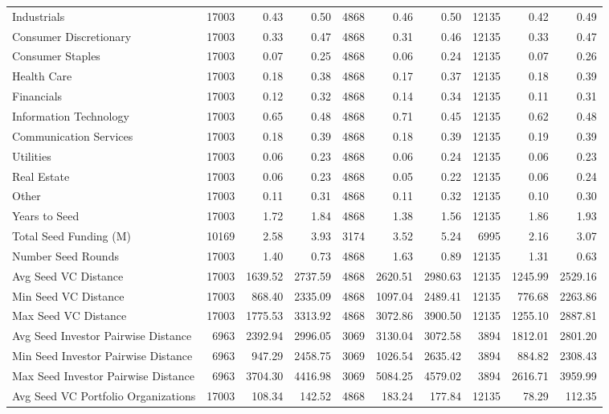 {\begin{table}[!h]
{\begin{tabular}[t]{lrrrrrrrrr}
Industrials & 17003 & 0.43 & 0.50 & 4868 & 0.46 & 0.50 & 12135 & 0.42 & 0.49\\
Consumer Discretionary & 17003 & 0.33 & 0.47 & 4868 & 0.31 & 0.46 & 12135 & 0.33 & 0.47\\
Consumer Staples & 17003 & 0.07 & 0.25 & 4868 & 0.06 & 0.24 & 12135 & 0.07 & 0.26\\
Health Care & 17003 & 0.18 & 0.38 & 4868 & 0.17 & 0.37 & 12135 & 0.18 & 0.39\\
Financials & 17003 & 0.12 & 0.32 & 4868 & 0.14 & 0.34 & 12135 & 0.11 & 0.31\\
\addlinespace
Information Technology & 17003 & 0.65 & 0.48 & 4868 & 0.71 & 0.45 & 12135 & 0.62 & 0.48\\
Communication Services & 17003 & 0.18 & 0.39 & 4868 & 0.18 & 0.39 & 12135 & 0.19 & 0.39\\
Utilities & 17003 & 0.06 & 0.23 & 4868 & 0.06 & 0.24 & 12135 & 0.06 & 0.23\\
Real Estate & 17003 & 0.06 & 0.23 & 4868 & 0.05 & 0.22 & 12135 & 0.06 & 0.24\\
Other & 17003 & 0.11 & 0.31 & 4868 & 0.11 & 0.32 & 12135 & 0.10 & 0.30\\
\addlinespace
Years to Seed & 17003 & 1.72 & 1.84 & 4868 & 1.38 & 1.56 & 12135 & 1.86 & 1.93\\
Total Seed Funding (M) & 10169 & 2.58 & 3.93 & 3174 & 3.52 & 5.24 & 6995 & 2.16 & 3.07\\
Number Seed Rounds & 17003 & 1.40 & 0.73 & 4868 & 1.63 & 0.89 & 12135 & 1.31 & 0.63\\
Avg Seed VC Distance & 17003 & 1639.52 & 2737.59 & 4868 & 2620.51 & 2980.63 & 12135 & 1245.99 & 2529.16\\
Min Seed VC Distance & 17003 & 868.40 & 2335.09 & 4868 & 1097.04 & 2489.41 & 12135 & 776.68 & 2263.86\\
\addlinespace
Max Seed VC Distance & 17003 & 1775.53 & 3313.92 & 4868 & 3072.86 & 3900.50 & 12135 & 1255.10 & 2887.81\\
Avg Seed Investor Pairwise Distance & 6963 & 2392.94 & 2996.05 & 3069 & 3130.04 & 3072.58 & 3894 & 1812.01 & 2801.20\\
Min Seed Investor Pairwise Distance & 6963 & 947.29 & 2458.75 & 3069 & 1026.54 & 2635.42 & 3894 & 884.82 & 2308.43\\
Max Seed Investor Pairwise Distance & 6963 & 3704.30 & 4416.98 & 3069 & 5084.25 & 4579.02 & 3894 & 2616.71 & 3959.99\\
Avg Seed VC Portfolio Organizations & 17003 & 108.34 & 142.52 & 4868 & 183.24 & 177.84 & 12135 & 78.29 & 112.35\\

\end{tabular}}
\end{table}}
